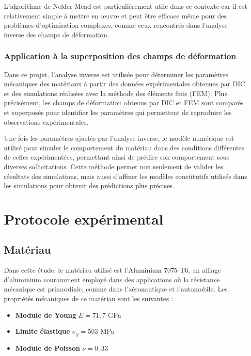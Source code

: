 \documentclass[12pt,a4paper]{article}
\begin{document}
L'algorithme de Nelder-Mead est particulièrement utile dans ce contexte car il est relativement simple à mettre en œuvre et peut être efficace même pour des problèmes d'optimisation complexes, comme ceux rencontrés dans l'analyse inverse des champs de déformation.

\subsubsection{Application à la superposition des champs de déformation}
Dans ce projet, l'analyse inverse est utilisée pour déterminer les paramètres mécaniques des matériaux à partir des données expérimentales obtenues par DIC et des simulations réalisées avec la méthode des éléments finis (FEM). Plus précisément, les champs de déformation obtenus par DIC et FEM sont comparés et superposés pour identifier les paramètres qui permettent de reproduire les observations expérimentales.

Une fois les paramètres ajustés par l'analyse inverse, le modèle numérique est utilisé pour simuler le comportement du matériau dans des conditions différentes de celles expérimentées, permettant ainsi de prédire son comportement sous diverses sollicitations. Cette méthode permet non seulement de valider les résultats des simulations, mais aussi d'affiner les modèles constitutifs utilisés dans les simulations pour obtenir des prédictions plus précises.

\section{Protocole expérimental}
\subsection{Matériau}
Dans cette étude, le matériau utilisé est l'Aluminium 7075-T6, un alliage d'aluminium couramment employé dans des applications où la résistance mécanique est primordiale, comme dans l'aéronautique et l'automobile. Les propriétés mécaniques de ce matériau sont les suivantes :

\begin{itemize}
    \item \textbf{Module de Young} \( E = 71,7 \) GPa
    \item \textbf{Limite élastique} \( \sigma_y = 503 \) MPa
    \item \textbf{Module de Poisson} \( \nu = 0,33 \)
\end{itemize}
\end{document}
